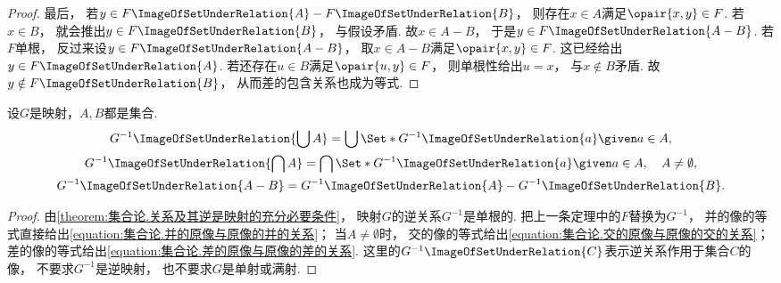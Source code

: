\begin{theorem}
\begin{proof}
        最后，
        若\(y\in F\ImageOfSetUnderRelation{A}-F\ImageOfSetUnderRelation{B}\)，
        则存在\(x\in A\)满足\(\opair{x,y}\in F\).
        若\(x\in B\)，
        就会推出\(y\in F\ImageOfSetUnderRelation{B}\)，
        与假设矛盾.
        故\(x\in A-B\)，
        于是\(y\in F\ImageOfSetUnderRelation{A-B}\).
        若\(F\)单根，
        反过来设\(y\in F\ImageOfSetUnderRelation{A-B}\)，
        取\(x\in A-B\)满足\(\opair{x,y}\in F\).
        这已经给出\(y\in F\ImageOfSetUnderRelation{A}\).
        若还存在\(u\in B\)满足\(\opair{u,y}\in F\)，
        则单根性给出\(u=x\)，
        与\(x\notin B\)矛盾.
        故\(y\notin F\ImageOfSetUnderRelation{B}\)，
        从而差的包含关系也成为等式.
    \end{proof}
\end{theorem}

\begin{corollary}
    设\(G\)是映射，\(A,B\)都是集合.
    \begin{gather}
        G^{-1}\ImageOfSetUnderRelation{\bigcup A} = \bigcup\Set*{ G^{-1}\ImageOfSetUnderRelation{a} \given a \in A },
        \label{equation:集合论.并的原像与原像的并的关系} \\
        G^{-1}\ImageOfSetUnderRelation{\bigcap A} = \bigcap\Set*{ G^{-1}\ImageOfSetUnderRelation{a} \given a \in A }, \quad A \neq \emptyset,
        \label{equation:集合论.交的原像与原像的交的关系} \\
        G^{-1}\ImageOfSetUnderRelation{A - B} = G^{-1}\ImageOfSetUnderRelation{A} - G^{-1}\ImageOfSetUnderRelation{B}.
        \label{equation:集合论.差的原像与原像的差的关系}
    \end{gather}
    \begin{proof}
        由\cref{theorem:集合论.关系及其逆是映射的充分必要条件}，
        映射\(G\)的逆关系\(G^{-1}\)是单根的.
        把上一条定理中的\(F\)替换为\(G^{-1}\)，
        并的像的等式直接给出\cref{equation:集合论.并的原像与原像的并的关系}；
        当\(A\neq\emptyset\)时，
        交的像的等式给出\cref{equation:集合论.交的原像与原像的交的关系}；
        差的像的等式给出\cref{equation:集合论.差的原像与原像的差的关系}.
        这里的\(G^{-1}\ImageOfSetUnderRelation{C}\)表示逆关系作用于集合\(C\)的像，
        不要求\(G^{-1}\)是逆映射，
        也不要求\(G\)是单射或满射.
    \end{proof}
\end{corollary}

